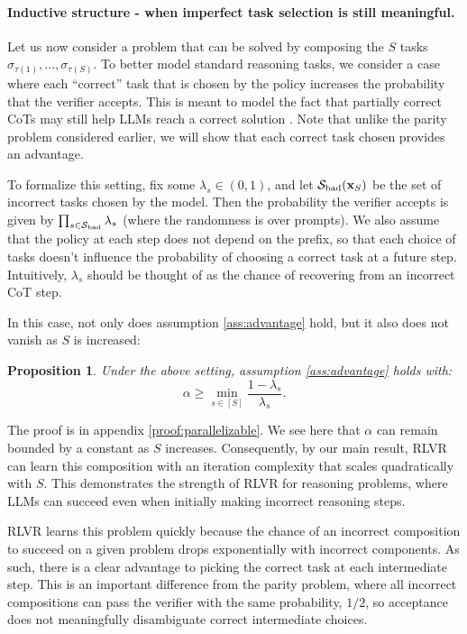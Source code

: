 \documentclass{article}
\theoremstyle{plain}
\newtheorem{proposition}[theorem]{Proposition}
\theoremstyle{definition}
\theoremstyle{remark}
\begin{document}
\paragraph{Inductive structure - when imperfect task selection is still meaningful.} 
Let us now consider a problem that can be solved by composing the $S$ tasks $\sigma_{\tau(1)},...,\sigma_{\tau(S)}$. 
To better model standard reasoning tasks, we consider a case where each ``correct'' task that is chosen by the policy increases the probability that the verifier accepts. This is meant to model the fact that partially correct CoTs may still help LLMs reach a correct solution \citep{yu2025formalmath}. Note that unlike the parity problem considered earlier, we will show that each correct task chosen provides an advantage.

To formalize this setting, fix some $\lambda_s \in (0, 1)$, and let $\mathcal{S}_{\text{bad}}(\mathbf{x}_S)$ be the set of incorrect tasks chosen by the model. Then the probability the verifier accepts is given by $\prod_{s \in \mathcal{S}_{\text{bad}}}\lambda_s$ (where the randomness is over prompts). We also assume that the policy at each step does not depend on the prefix, so that each choice of tasks doesn't influence the probability of choosing a correct task at a future step. Intuitively, $\lambda_s$ should be thought of as the chance of recovering from an incorrect CoT step. 

In this case, not only does assumption \ref{ass:advantage} hold, but it also does not vanish as $S$ is increased:
\begin{proposition}\label{prop:parallelizable}
    Under the above setting,
    assumption \ref{ass:advantage} holds with:
    \[
        \alpha \geq  \min_{s \in [S]}\frac{1 - \lambda_s}{\lambda_s}.
    \]
\end{proposition}
The proof is in appendix \ref{proof:parallelizable}.
We see here that $\alpha$ can remain bounded by a constant as $S$ increases. Consequently, by our main result, RLVR can learn this composition with an iteration complexity that scales quadratically with $S$. This demonstrates the strength of RLVR for reasoning problems, where LLMs can succeed even when initially making incorrect reasoning steps.

RLVR learns this problem quickly because the chance of an incorrect composition to succeed on a given problem drops exponentially with incorrect components. As such, there is a clear advantage to picking the correct task at each intermediate step. This is an important difference from the parity problem, where all incorrect compositions can pass the verifier with the same probability, $1/2$, so acceptance does not meaningfully disambiguate correct intermediate choices.
\end{document}
